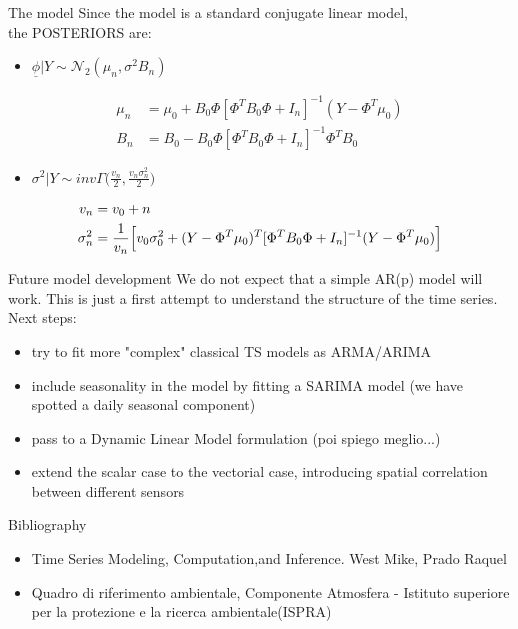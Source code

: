 \documentclass[10pt]{beamer}
\theoremstyle{remark}
\theoremstyle{definition}
\begin{document}
\begin{frame}{The model}
Since the model is a standard conjugate linear model,\\
the  POSTERIORS are:

\begin{center}
      \begin{itemize} 
  \item $\underline{\phi }|Y \sim \mathcal{N}_2 (\mu_n, \sigma^2 B_n)$
  \end{itemize}
  \end{center}
  \begin{align*}
      \mu_n &= \mu_0 + B_0 \Phi[\Phi^{T} B_0 \Phi + I_n]^{-1}(Y - \Phi^T\mu_0) \\
      B_n &= B_0 - B_0\Phi[\Phi^{T} B_0 \Phi + I_n]^{-1}\Phi^T B_0
  \end{align*}
       
\begin{center}
\begin{itemize}
\item   $\sigma^2 | Y \sim inv\Gamma \Biggl(\frac{v_n}{2}, \frac{v_n \sigma_n^2}{2} \Biggr)$ 
\end{itemize}
\end{center}
\begin{align*}
    v_n & = v_0 + n \\
    \sigma_n^2 & = \frac{1}{v_n} \Bigl[ v_0\sigma_0^2 + (Y - \Phi^T\mu_0)^T [\Phi^T B_0 \Phi + I_n]^{-1} (Y - \Phi^T\mu_0) \Bigr]
\end{align*}
   
\end{frame}

\begin{frame}{Future model development}
    We do not expect that a simple AR(p) model will work. This is just a first attempt to understand the structure of the time series. Next steps:
    \begin{itemize}
        \item try to fit more "complex" classical TS models as ARMA/ARIMA
        \item include seasonality in the model by fitting a SARIMA model (we have spotted a daily seasonal component)
        \item pass to a Dynamic Linear Model formulation (poi spiego meglio...) 
        \item extend the scalar case to the vectorial case, introducing spatial correlation between different sensors
    \end{itemize}
\end{frame}
\begin{frame}{Bibliography}
\begin{itemize}
    \item Time Series Modeling, Computation,and Inference. 
\vspace{3mm}
West Mike, Prado Raquel
\item Quadro di riferimento ambientale, Componente Atmosfera - Istituto superiore per la protezione e la ricerca ambientale(ISPRA) 

\end{itemize}
    
\end{frame}
\end{document}
